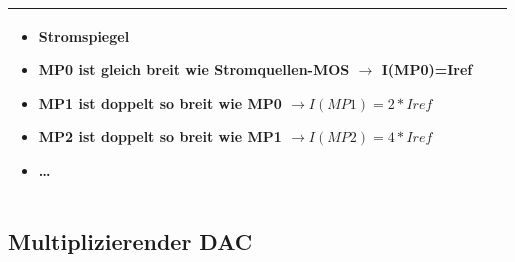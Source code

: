 \begin{longtable}{|l|l|l|}
\begin{minipage}{8cm}
\begin{itemize}
  \item Stromspiegel
  \item MP0 ist gleich breit wie Stromquellen-MOS $\to$ I(MP0)=Iref
  \item MP1 ist doppelt so breit wie MP0 $\to I(MP1)=2*Iref$
  \item MP2 ist doppelt so breit wie MP1 $\to I(MP2)=4*Iref$
  \item \ldots
\end{itemize}
\end{minipage}
\\
\hline
\end{longtable}


\subsection{Multiplizierender DAC} 

